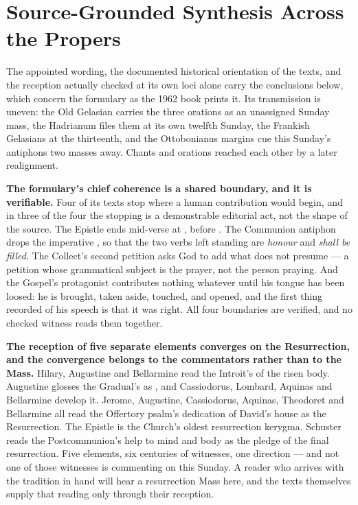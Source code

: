 \sectionguard
\section*{Source-Grounded Synthesis Across the Propers}

The appointed wording, the documented historical orientation of the texts,
and the reception actually checked at its own loci alone carry the conclusions
below, which concern the formulary as the 1962 book prints it. Its
transmission is uneven: the Old Gelasian carries the three orations as an
unassigned Sunday mass, the Hadrianum files them at its own twelfth Sunday,
the Frankish Gelasians at the thirteenth, and the Ottobonianus margins cue
this Sunday's antiphons two masses away. Chants and orations reached each
other by a later realignment.

\textbf{The formulary's chief coherence is a shared boundary, and it is
verifiable.} Four of its texts stop where a human contribution would begin, and
in three of the four the stopping is a demonstrable editorial act, not the
shape of the source. The Epistle ends mid-verse at ,
before . The Communion antiphon
drops the imperative , so that the two verbs left standing are
\textit{honour} and \textit{shall be filled}. The Collect's second petition
asks God to add what  does not presume --- a petition whose
grammatical subject is the prayer, not the person praying. And the Gospel's
protagonist contributes nothing whatever until his tongue has been loosed: he
is brought, taken aside, touched, and opened, and the first thing recorded of
his speech is that it was right. All four boundaries are verified,
and no checked witness reads them together.

\textbf{The reception of five separate elements converges on the
Resurrection, and the convergence belongs to the commentators rather than to
the Mass.} Hilary, Augustine and Bellarmine read the Introit's
 of the risen body. Augustine glosses the
Gradual's  as , and
Cassiodorus, Lombard, Aquinas and Bellarmine develop it. Jerome, Augustine,
Cassiodorus, Aquinas, Theodoret and Bellarmine all read the Offertory psalm's
dedication of David's house as the Resurrection. The Epistle is the Church's
oldest resurrection kerygma. Schuster reads the Postcommunion's help to mind
and body as the pledge of the final resurrection. Five elements, six centuries
of witnesses, one direction --- and not one of those witnesses is commenting on
this Sunday. A reader who arrives with the tradition in hand will hear a
resurrection Mass here, and the texts themselves supply that reading only
through their reception.

